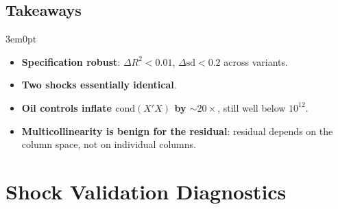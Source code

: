 \documentclass[12pt]{article}
\newenvironment{bodyL2}{\begin{adjustwidth}{3em}{0pt}}{\end{adjustwidth}}
\begin{document}
\subsection{Takeaways}
\begin{bodyL2}
\begin{itemize}
    \item \textbf{Specification robust}: $\Delta R^2 < 0.01$, $\Delta\text{sd} < 0.2$ across variants.
    \item \textbf{Two shocks essentially identical}.
    \item \textbf{Oil controls inflate $\mathrm{cond}(X'X)$ by $\sim 20\times$}, still well below $10^{12}$.
    \item \textbf{Multicollinearity is benign for the residual}: residual depends on the column space, not on individual columns.
\end{itemize}
\end{bodyL2}

\section{Shock Validation Diagnostics}
\end{document}

